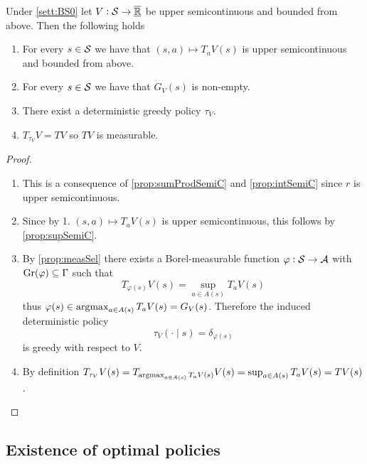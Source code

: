 \begin{prop}
  Under \cref{sett:BS0}
  let $V:\mathcal{S} \to \overline{\underline{\mathbb{R}}}$ be upper semicontinuous and bounded from above.
  Then the following holds
  \leavevmode
  \begin{enumerate}
    \item For every $s \in \mathcal{S}$ we have that
      $(s, a) \mapsto T_a V(s)$ is upper semicontinuous and bounded from above.
    \item For every $s \in \mathcal{S}$ we have that $G_V(s)$ is non-empty.
    \item There exist a deterministic greedy policy $\tau_V$.
    \item $T_{\tau_V} V = TV$ so $TV$ is measurable.
  \end{enumerate}
  \label{prop:greedyExi}
\end{prop}
\begin{proof}
  \leavevmode
  \begin{enumerate}
    \item This is a consequence of \cref{prop:sumProdSemiC}
      and \cref{prop:intSemiC} since $r$ is upper semicontinuous.
    \item Since by 1. $(s, a) \mapsto T_a V(s)$ is upper semicontinuous, this
      follows by \cref{prop:supSemiC}.
    \item By \cref{prop:measSel} there exists a Borel-measurable function
      $\varphi : \mathcal{S} \to \mathcal{A}$ with $\mathrm{Gr}(\varphi) \subseteq \Gamma$
      such that
      \[ T_{\varphi(s)} V(s) = \sup_{a \in A(s)} T_a V(s) \]
      thus $\varphi(s) \in \operatorname*{argmax}_{a \in A(s)} T_a V(s) = G_V(s)$.
      Therefore the induced deterministic policy
      \[ \tau_V(\cdot \mid s) = \delta_{\varphi(s)} \]
      is greedy with respect to $V$.
    \item By definition $T_{\tau_V} V(s) = T_{\operatorname*{argmax}_{a \in A(s)} T_a V(s)}
      V(s) = \sup_{a \in A(s)} T_a V(s) = TV(s)$.
  \end{enumerate}
\end{proof}

\subsection{Existence of optimal policies}

